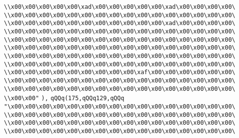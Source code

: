 \verb|\\x00\x00\x00\x00\x00\xad\x00\x00\x00\x00\x00\xad\x00\x00\x00\x00\|\newline
\verb|\\x00\x00\x00\x00\x00\x00\x00\x00\x00\x00\x00\x00\x00\x00\x00\x00\|\newline
\verb|\\x00\x00\x00\x00\x00\x00\x00\x00\x00\x00\x00\xad\x00\x00\x00\x00\|\newline
\verb|\\x00\x00\x00\x00\x00\x00\x00\x00\x00\x00\x00\x00\x00\x00\x00\x00\|\newline
\verb|\\x00\x00\x00\x00\x00\x00\x00\x00\x00\x00\x00\x00\x00\x00\x00\x00\|\newline
\verb|\\x00\x00\x00\x00\x00\x00\x00\x00\x00\x00\x00\x00\x00\x00\x00\x00\|\newline
\verb|\\x00\x00\x00\x00\x00\x00\x00\x00\x00\x00\x00\x00\x00\x00\x00\x00\|\newline
\verb|\\x00\x00\x00\x00\x00\x00\x00\x00\x00\x00\x00\x00\x00\x00\x00\x00\|\newline
\verb|\\x00\x00\x00\x00\x00\x00\x00\x00\x00\xaf\x00\x00\x00\x00\x00\x00\|\newline
\verb|\\x00\x00\x00\x00\x00\x00\x00\x00\x00\x00\x00\x00\x00\x00\x00\x00\|\newline
\verb|\\x00\x00\x00\x00\x00\x00\x00\x00\x00\x00\x00\x00\x00\x00\x00\x00\|\newline
\verb|\\x00\x00"|\newline
\verb|),|\newline
\verb|qQQq(175,qQQq129,qQQq|\newline
\verb|"\x00\x00\x00\x00\x00\x00\x00\x00\x00\x00\x00\x00\x00\x00\x00\x00\|\newline
\verb|\\x00\x00\x00\x00\x00\x00\x00\x00\x00\x00\x00\x00\x00\x00\x00\x00\|\newline
\verb|\\x00\x00\x00\x00\x00\x00\x00\x00\x00\x00\x00\x00\x00\x00\x00\x00\|\newline
\verb|\\x00\x00\x00\x00\x00\x00\x00\x00\x00\x00\x00\x00\x00\x00\x00\x00\|\newline
